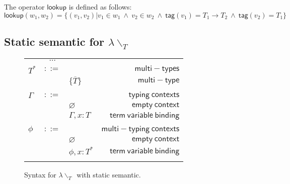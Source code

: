 \documentclass[preprint,authoryear,sort&compress,9pt,nocopyrightspace]{article}
\newcommand{\lab}{\mathsf{tag}}
\newcommand{\buscar}{\mathsf{lookup}}
\newcommand{\semanticD}{${\lambda}{\backslash}_T$}
\newcommand{\mtP}[1]{#1^{*}}
\newcommand{\mtC}[1]{\{\overline {#1}\}}
\newcommand{\emt}{\phi}
\begin{document}
\begin{definition}[$\buscar$]
\label{definition:tcs}
\mbox{}
The operator $\buscar$ is defined  as follows:
\[ \buscar(w_1, w_2) =  
  \{(v_1, v_2) | v_1 \in w_1 \ \wedge \ v_2 \in w_2 \ \wedge \ \lab(v_1) = T_1 \to T_2 \ \wedge \ \lab(v_2) = T_1\}
\]
\end{definition}



\subsection{Static semantic for \semanticD}



\begin{figure}
\begin{small}
\begin{center}
\begin{tabular}{|l c l r|}
\hline
&$\cdots$&&\\
$\mtP{T}$&$::=$&&$\mathsf {multi-types}$\\
&&$\mtC{T}$&$\mathsf {multi-type}$\\
&&&\\
$\Gamma$&$::=$&&$\mathsf {typing \ contexts}$\\
&&$\varnothing$&$\mathsf {empty \ context}$\\
&&$\Gamma , x:T$&$\mathsf {term \ variable \ binding}$\\
&&&\\
$\emt$&$::=$&&$\mathsf {multi-typing \ contexts}$\\
&&$\varnothing$&$\mathsf {empty \ context}$\\
&&$\emt,x: \mtP{T}$&$\mathsf {term \ variable \ binding}$\\
&&&\\
\hline
\end{tabular}
\caption{Syntax for \semanticD \ with static semantic. }
\label{tabla:syntaxstatic}
\end{center}
\end{small}
\end{figure}
\end{document}
